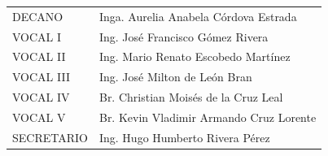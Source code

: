 \documentclass[12pt,spanish,Letterpaper,openany]{book}
\begin{document}
\begin{longtable}[]{@{}ll@{}}
\endhead
\begin{minipage}[t]{0.239\columnwidth}\raggedright
DECANO\strut
\end{minipage} & \begin{minipage}[t]{0.35\columnwidth}\raggedright
Inga. Aurelia Anabela Córdova Estrada\strut
\end{minipage}\tabularnewline
\begin{minipage}[t]{0.239\columnwidth}\raggedright
VOCAL I\strut
\end{minipage} & \begin{minipage}[t]{0.35\columnwidth}\raggedright
Ing. José Francisco Gómez Rivera\strut
\end{minipage}\tabularnewline
\begin{minipage}[t]{0.239\columnwidth}\raggedright
VOCAL II\strut
\end{minipage} & \begin{minipage}[t]{0.35\columnwidth}\raggedright
Ing. Mario Renato Escobedo Martínez\strut
\end{minipage}\tabularnewline
\begin{minipage}[t]{0.239\columnwidth}\raggedright
VOCAL III\strut
\end{minipage} & \begin{minipage}[t]{0.35\columnwidth}\raggedright
Ing. José Milton de León Bran\strut
\end{minipage}\tabularnewline
\begin{minipage}[t]{0.239\columnwidth}\raggedright
VOCAL IV\strut
\end{minipage} & \begin{minipage}[t]{0.35\columnwidth}\raggedright
Br. Christian Moisés de la Cruz Leal\strut
\end{minipage}\tabularnewline
\begin{minipage}[t]{0.239\columnwidth}\raggedright
VOCAL V\strut
\end{minipage} & \begin{minipage}[t]{0.35\columnwidth}\raggedright
Br. Kevin Vladimir Armando Cruz Lorente\strut
\end{minipage}\tabularnewline
\begin{minipage}[t]{0.239\columnwidth}\raggedright
SECRETARIO\strut
\end{minipage} & \begin{minipage}[t]{0.35\columnwidth}\raggedright
Ing. Hugo Humberto Rivera Pérez\strut
\end{minipage}\tabularnewline
\end{longtable}
\end{document}
